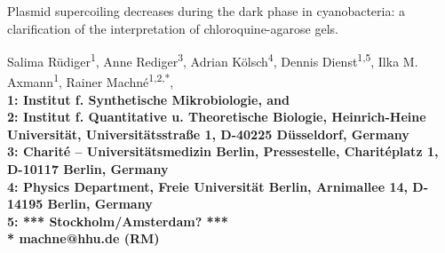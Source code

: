 \documentclass[10pt,a4]{article}
\newcommand{\TODO}[1]{\begingroup\color{red}*** #1 ***\endgroup}
\begin{document}


\begin{flushleft}
{\Large Plasmid supercoiling decreases during the dark phase in
  cyanobacteria: a clarification of the interpretation of
  chloroquine-agarose gels.}

Salima R\"udiger\textsuperscript{1}, 
Anne Rediger\textsuperscript{3},
Adrian K\"olsch\textsuperscript{4},
Dennis Dienst\textsuperscript{1,5},
Ilka M. Axmann\textsuperscript{1},
Rainer Machn\'e\textsuperscript{1,2,*},
\\
\bigskip
\bf{1:} Institut f. Synthetische Mikrobiologie, and\\
\bf{2:} Institut f. Quantitative u. Theoretische Biologie, Heinrich-Heine Universit\"at, Universit\"atsstra\ss{}e 1, D-40225 D\"usseldorf, Germany
\\
\bf{3:} Charit\'e -- Universit\"atsmedizin Berlin, Pressestelle, Charit\'eplatz 1, D-10117 Berlin, Germany
\\
\bf{4:} Physics Department, Freie Universität Berlin, Arnimallee 14, D-14195 Berlin, Germany
\\
\bf{5:} \TODO{Stockholm/Amsterdam?}
\\
\bigskip
* machne@hhu.de (RM)

\end{flushleft}
\end{document}
